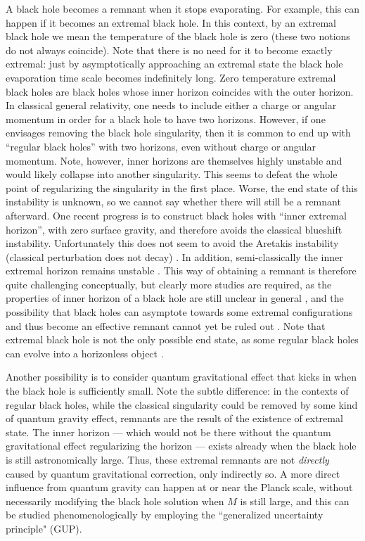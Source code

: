 \documentclass[preprintnumbers, floatfix, preprintnumbers, letterpaper, twocolumn, superscriptaddress,nofootinbib]{revtex4-2}
\begin{document}
A black hole becomes a remnant when it stops evaporating. For example, this can happen if it becomes an extremal black hole. 
In this context, by an extremal black hole we mean the temperature of the black hole is zero (these two notions do not always coincide). 
Note that there is no need for it to become exactly extremal: just by asymptotically approaching an extremal state the black hole evaporation time scale becomes indefinitely long.
Zero temperature extremal black holes are black holes whose inner horizon coincides with the outer horizon. In classical general relativity, one needs to include either a charge or angular momentum in order for a black hole to have two horizons. However, if one envisages removing the black hole singularity, then it is common to end up with ``regular black holes'' with two horizons, even without charge or angular momentum. Note, however, inner horizons are themselves highly unstable and would likely collapse into another singularity. This seems to defeat the whole point of regularizing the singularity in the first place. Worse, the end state of this instability is unknown, so we cannot say whether there will still be a remnant afterward. One recent progress is to construct black holes with ``inner extremal horizon'', with zero surface gravity, and therefore avoids the classical blueshift instability. Unfortunately this does not seem to avoid the Aretakis instability (classical perturbation does not decay) \cite{1206.6598,1208.1437,1212.2557,2112.09832}. In addition, semi-classically the inner extremal horizon remains unstable \cite{2303.03562}. This way of obtaining a remnant is therefore quite challenging conceptually, but clearly more studies are required, as the properties of inner horizon of a black hole are still unclear in general \cite{2308.09225}, and the possibility that black holes can asymptote towards some extremal configurations and thus become an effective remnant cannot yet be ruled out \cite{2405.08069}. Note that extremal black hole is not the only possible end state, as some regular black holes can evolve into a horizonless object \cite{2211.05817,2302.00028,2410.10582}. 

Another possibility is to consider quantum gravitational effect that kicks in when the black hole is sufficiently small. Note the subtle difference: in the contexts of regular black holes, while the classical singularity could be removed by some kind of quantum gravity effect, remnants are the result of the existence of extremal state. The inner horizon --- which would not be there without the quantum gravitational effect regularizing the horizon --- exists already when the black hole is still astronomically large. Thus, these extremal remnants are not \emph{directly} caused by quantum gravitational correction, only indirectly so. A more direct influence from quantum gravity can happen at or near the Planck scale, without necessarily modifying the black hole solution when $M$ is still large, and this can be studied phenomenologically by employing the ``generalized uncertainty principle" (GUP). 
\end{document}
